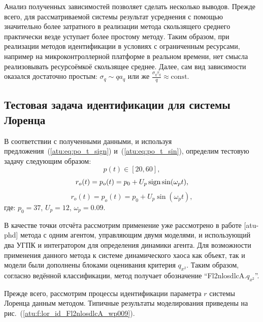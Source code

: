 Анализ полученных зависимостей позволяет сделать
несколько выводов. Прежде всего, для рассматриваемой системы
результат усреднения с помощью значительно более затратного
в реализации метода скользящего среднего практически везде
уступает более простому методу. Таким образом,
при реализации методов идентификации в условиях с ограниченным ресурсами,
например на микроконтроллерной платформе в реальном времени,
нет смысла реализовывать ресурсоёмкоё скользящее среднее.
Далее, сам вид зависимости оказался достаточно простым:
$ \sigma_q \sim q a_q $ или же
$ \frac{\sigma_q \tau_q}{q} \approx \mathrm{const}$.



\subsection{Тестовая задача идентификации для системы Лоренца}  %

В соответствии с полученными данными, и используя
предложения~(\ref{atu:eq:po_t_sign}) и~(\ref{atu:eq:po_t_sin}),
определим тестовую задачу следующим образом:
\[
  p(t) \in [20, 60],
\]
%
\begin{equation}
  r_o(t) = p_o(t) = p_0 +  U_{p} \operatorname*{sign} \sin( \omega_{p} t ),
  \label{atu:eq:lor_po_t_sign}
\end{equation}
%
%
\begin{equation}
  r_o(t) = p_o(t) = p_0 +  U_{p} \sin( \omega_{p} t ),
  \label{atu:eq:lor_po_t_sin}
\end{equation}
%
где:
$p_0 = 37$, $U_p=12$, $\omega_p=0.09$.

В качестве точки отсчёта рассмотрим применение уже рассмотрено в работе [atu-phd]
метода с одним агентом, управляющим двумя моделями,
и использующий два УГПК и интегратором для определения динамики агента.
Для возможности применения данного метода к системе динамического хаоса
как объект, так и модели были дополнены блоками оценивания критерия $q_{x^2}$.
Таким образом, согласно ведённой классификации,
метод получает обозначение
``Fl2nlosdlcA.$q_{x^2}$''.

Прежде всего, рассмотрим процессы идентификации параметра $r$
системы Лоренца данным методом. Типичные результаты моделирования
приведены на рис.~(\ref{atu:f:lor_id_Fl2nlosdlcA_wp009}).

